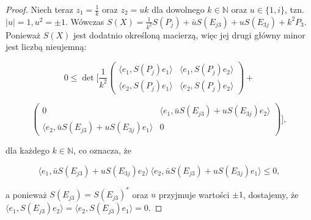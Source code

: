 {\begin{proof}
Niech teraz $z_{1} =  \frac{1}{k}$ oraz $z_{2} = u k$ dla dowolnego
$k \in \mathbb{N}$ oraz $u \in \{ 1, i \}$, tzn. $|u| = 1, u^{2} = \pm 1$.
Wówczas
$S(X) = \frac{1}{k^{2}} S(P_{j}) + \bar{u} S(E_{j3}) + u S(E_{3j}) + k^{2} P_{3}$.
Ponieważ $S(X)$ jest dodatnio określoną macierzą, więc jej drugi główny minor
jest liczbą nieujemną:
\begin{linenomath*}
\begin{equation}
  \nonumber
    0 \leq \det \Bigg[ \frac{1}{k^{2}} \begin{pmatrix}
          \langle e_{1} , S(P_{j}) e_{1} \rangle &  \langle e_{1} , S(P_{j}) e_{2} \rangle  \\
          \langle e_{2} , S(P_{j}) e_{1} \rangle &  \langle e_{2} , S(P_{j}) e_{2} \rangle
                \end{pmatrix}
                +
\end{equation}
\end{linenomath*}
\begin{linenomath*}
\begin{equation}
                \begin{pmatrix}
          0 & \langle e_{1} , \bar{u} S(E_{j3}) + u S(E_{3j})  e_{2} \rangle \\
          \langle e_{2} , \bar{u} S(E_{j3}) + u S(E_{3j})  e_{1} \rangle & 0
              \end{pmatrix}
          \Bigg],
\end{equation}
\end{linenomath*}
dla każdego $k \in \mathbb{N}$,
co oznacza, że
\begin{linenomath*}
\begin{equation}
 \langle e_{1} , \bar{u} S(E_{j3}) + u S(E_{3j})  e_{2} \rangle \
\langle e_{2} , \bar{u} S(E_{j3}) + u S(E_{3j})  e_{1} \rangle  \leq 0,
\end{equation}
\end{linenomath*}
a ponieważ $S(E_{j3}) = S(E_{j3})^{*}$ oraz $u$ przyjmuje wartości $\pm 1$,
dostajemy, że
$\langle e_{1}, S(E_{j3}) e_{2} \rangle = \langle e_{2}, S(E_{j3}) e_{1} \rangle = 0$.


\end{proof}}

